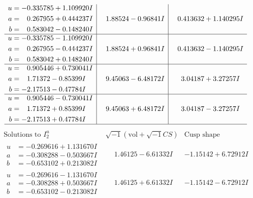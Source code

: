 \documentclass[1p]{elsarticle_modified}
\theoremstyle{definition}
\newcommand{\I}{\sqrt{-1}}
\begin{document}
$$\begin{array}{c|c|c}
\begin{aligned}
u &= -0.335785 + 1.109920 I \\
a &= \phantom{-}0.267955 + 0.444237 I \\
b &= \phantom{-}0.583042 - 0.148240 I\end{aligned}
 & \phantom{-}1.88524 - 0.96841 I & \phantom{-}0.413632 + 1.140295 I \\ \hline\begin{aligned}
u &= -0.335785 - 1.109920 I \\
a &= \phantom{-}0.267955 - 0.444237 I \\
b &= \phantom{-}0.583042 + 0.148240 I\end{aligned}
 & \phantom{-}1.88524 + 0.96841 I & \phantom{-}0.413632 - 1.140295 I \\ \hline\begin{aligned}
u &= \phantom{-}0.905446 + 0.730041 I \\
a &= \phantom{-}1.71372 - 0.85399 I \\
b &= -2.17513 - 0.47784 I\end{aligned}
 & \phantom{-}9.45063 - 6.48172 I & \phantom{-}3.04187 + 3.27257 I \\ \hline\begin{aligned}
u &= \phantom{-}0.905446 - 0.730041 I \\
a &= \phantom{-}1.71372 + 0.85399 I \\
b &= -2.17513 + 0.47784 I\end{aligned}
 & \phantom{-}9.45063 + 6.48172 I & \phantom{-}3.04187 - 3.27257 I\\
 \hline 
 \end{array}$$\newpage$$\begin{array}{c|c|c}  
\text{Solutions to }I^u_{2}& \I (\text{vol} + \sqrt{-1}CS) & \text{Cusp shape}\\
 \hline 
\begin{aligned}
u &= -0.269616 + 1.131670 I \\
a &= -0.308288 - 0.503667 I \\
b &= -0.653102 + 0.213082 I\end{aligned}
 & \phantom{-}1.46125 - 6.61332 I & -1.15142 + 6.72912 I \\ \hline\begin{aligned}
u &= -0.269616 - 1.131670 I \\
a &= -0.308288 + 0.503667 I \\
b &= -0.653102 - 0.213082 I\end{aligned}
 & \phantom{-}1.46125 + 6.61332 I & -1.15142 - 6.72912 I \\ \hline\begin{aligned}

\end{aligned}
\end{array}$$
\end{document}
